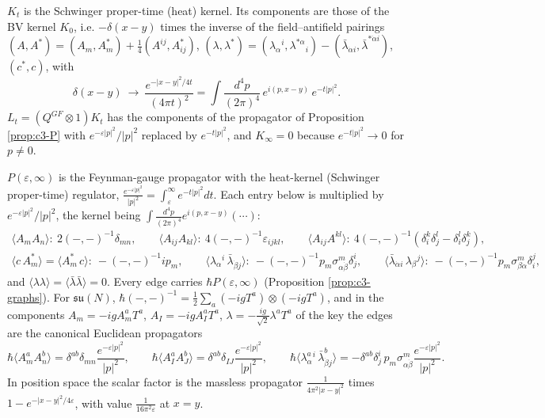 \begin{remark}
$K_t$ is the Schwinger proper-time (heat) kernel. Its components are those of the BV kernel $K_0$, i.e. $-\delta(x-y)$ times the inverse of the field--antifield pairings $(A,A^*)=(A_m,A^*_m)+\tfrac14(A^{ij},A^*_{ij})$, $(\lambda,\lambda^*)=(\lambda_\alpha{}^i,\lambda^{*\alpha}{}_i)-(\bar\lambda_{\dot\alpha i},\bar\lambda^{*\dot\alpha i})$, $(c^*,c)$, with
\[
\delta(x-y)\ \longrightarrow\ \frac{e^{-|x-y|^2/4t}}{(4\pi t)^2}=\int\frac{d^4p}{(2\pi)^4}\,e^{i(p,x-y)}\,e^{-t|p|^2}.
\]
$L_t=(Q^{GF}\otimes1)K_t$ has the components of the propagator of Proposition \ref{prop:c3-P} with $e^{-\varepsilon|p|^2}/|p|^2$ replaced by $e^{-t|p|^2}$, and $K_\infty=0$ because $e^{-t|p|^2}\to0$ for $p\neq0$.
\end{remark}

\begin{remark}
$P(\varepsilon,\infty)$ is the Feynman-gauge propagator with the heat-kernel (Schwinger proper-time) regulator, $\frac{e^{-\varepsilon|p|^2}}{|p|^2}=\int_\varepsilon^\infty e^{-t|p|^2}dt$. Each entry below is multiplied by $e^{-\varepsilon|p|^2}/|p|^2$, the kernel being $\int\frac{d^4p}{(2\pi)^4}e^{i(p,x-y)}(\cdots)$:
\[
\begin{gathered}
\langle A_mA_n\rangle:\ 2(-,-)^{-1}\delta_{mn},\qquad \langle A_{ij}A_{kl}\rangle:\ 4(-,-)^{-1}\varepsilon_{ijkl},\qquad \langle A_{ij}A^{kl}\rangle:\ 4(-,-)^{-1}(\delta_i^k\delta_j^l-\delta_i^l\delta_j^k),\\
\langle c\,A^*_m\rangle=\langle A^*_m\,c\rangle:\ -(-,-)^{-1}ip_m,\qquad \langle\lambda_\alpha{}^i\,\bar\lambda_{\dot\beta j}\rangle:\ -(-,-)^{-1}p_m\sigma^m_{\alpha\dot\beta}\delta^i_j,\qquad \langle\bar\lambda_{\dot\alpha i}\,\lambda_\beta{}^j\rangle:\ -(-,-)^{-1}p_m\sigma^m_{\beta\dot\alpha}\delta_i^j,
\end{gathered}
\]
and $\langle\lambda\lambda\rangle=\langle\bar\lambda\bar\lambda\rangle=0$. Every edge carries $\hbar P(\varepsilon,\infty)$ (Proposition \ref{prop:c3-graphs}). For $\mathfrak{su}(N)$, $\hbar(-,-)^{-1}=\tfrac12\sum_a(-igT^a)\otimes(-igT^a)$, and in the components $A_m=-igA^a_mT^a$, $A_I=-igA^a_IT^a$, $\lambda=-\tfrac{ig}{\sqrt2}\lambda^aT^a$ of the key the edges are the canonical Euclidean propagators
\[
\hbar\langle A^a_mA^b_n\rangle=\delta^{ab}\delta_{mn}\frac{e^{-\varepsilon|p|^2}}{|p|^2},\qquad \hbar\langle A^a_IA^b_J\rangle=\delta^{ab}\delta_{IJ}\frac{e^{-\varepsilon|p|^2}}{|p|^2},\qquad \hbar\langle\lambda^a_\alpha{}^i\,\bar\lambda^b_{\dot\beta j}\rangle=-\delta^{ab}\delta^i_j\,p_m\sigma^m_{\alpha\dot\beta}\frac{e^{-\varepsilon|p|^2}}{|p|^2}.
\]
In position space the scalar factor is the massless propagator $\frac1{4\pi^2|x-y|^2}$ times $1-e^{-|x-y|^2/4\varepsilon}$, with value $\frac1{16\pi^2\varepsilon}$ at $x=y$.
\end{remark}

